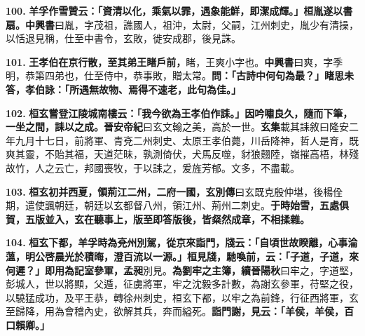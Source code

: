 \textbf{100.} \textbf{羊孚作雪贊云：「資清以化，乘氣以霏，遇象能鮮，即潔成輝。」桓胤遂以書扇。}{\footnotesize \textbf{中興書}曰胤，字茂祖，譙國人，祖沖，太尉，父嗣，江州刺史，胤少有清操，以恬退見稱，仕至中書令，玄敗，徙安成郡，後見誅。}

\textbf{101.} \textbf{王孝伯在京行散，至其弟王睹戶前，}{\footnotesize 睹，王爽小字也。\textbf{中興書}曰爽，字季明，恭第四弟也，仕至侍中，恭事敗，贈太常。}\textbf{問：「古詩中何句為最？」睹思未答，孝伯詠：「所遇無故物、焉得不速老，此句為佳。」}

\textbf{102.} \textbf{桓玄嘗登江陵城南樓云：「我今欲為王孝伯作誄。」因吟嘯良久，隨而下筆，一坐之間，誄以之成。}{\footnotesize \textbf{晉安帝紀}曰玄文翰之美，高於一世。\textbf{玄集}載其誄敘曰隆安二年九月十七日，前將軍、青兗二州刺史、太原王孝伯薨，川岳降神，哲人是育，既爽其靈，不貽其福，天道茫昧，孰測倚伏，犬馬反噬，豺狼翹陸，嶺摧高梧，林殘故竹，人之云亡，邦國喪牧，于以誄之，爰旌芳郁。文多，不盡載。}

\textbf{103.} \textbf{桓玄初并西夏，領荊江二州，二府一國，}{\footnotesize \textbf{玄別傳}曰玄既克殷仲堪，後楊佺期，遣使諷朝廷，朝廷以玄都督八州，領江州、荊州二刺史。}\textbf{于時始雪，五處俱賀，五版並入，玄在聽事上，版至即答版後，皆粲然成章，不相揉雜。}

\textbf{104.} \textbf{桓玄下都，羊孚時為兗州別駕，從京來詣門，牋云：「自頃世故睽離，心事淪薀，明公啓晨光於積晦，澄百流以一源。」桓見牋，馳喚前，云：「子道，子道，來何遲？」即用為記室參軍，孟昶}{\footnotesize 別見。}\textbf{為劉牢之主簿，}{\footnotesize \textbf{續晉陽秋}曰牢之，字道堅，彭城人，世以將顯，父遁，征虜將軍，牢之沈毅多計數，為謝玄參軍，苻堅之役，以驍猛成功，及平王恭，轉徐州刺史，桓玄下都，以牢之為前鋒，行征西將軍，玄至歸降，用為會稽內史，欲解其兵，奔而縊死。}\textbf{詣門謝，見云：「羊侯，羊侯，百口賴卿。」}